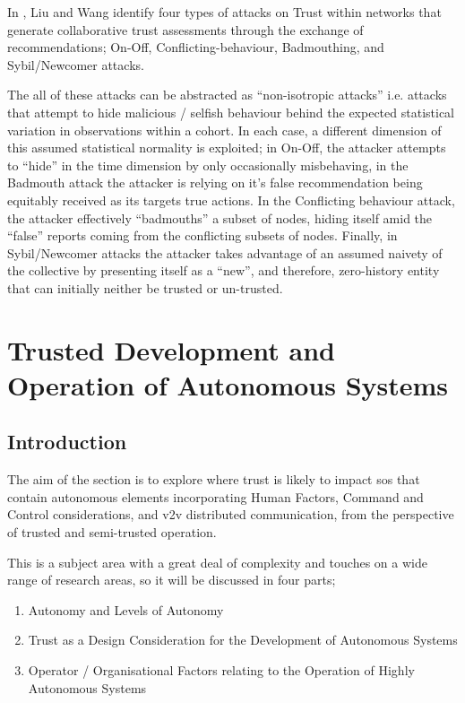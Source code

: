 In \cite{Liu2010}, Liu and Wang identify four types of attacks on Trust within networks that generate collaborative trust assessments through the exchange of recommendations; On-Off, Conflicting-behaviour, Badmouthing, and Sybil/Newcomer attacks. 

The all of these attacks can be abstracted as ``non-isotropic attacks'' i.e. attacks that attempt to hide malicious / selfish behaviour behind the expected statistical variation in observations within a cohort. In each case, a different dimension of this assumed statistical normality is exploited; in On-Off, the attacker attempts to ``hide'' in the time dimension by only occasionally misbehaving, in the Badmouth attack the attacker is relying on it's false recommendation being equitably received as its targets true actions. In the Conflicting behaviour attack, the attacker effectively ``badmouths'' a subset of nodes, hiding itself amid the ``false'' reports coming from the conflicting subsets of nodes. Finally, in Sybil/Newcomer attacks the attacker takes advantage of an assumed naivety of the collective by presenting itself as a ``new'', and therefore, zero-history entity that can initially neither be trusted or un-trusted.




\section{Trusted Development and Operation of Autonomous Systems}

\subsection{Introduction}

The aim of the section is to explore where trust is likely to impact \gls{sos} that contain autonomous elements incorporating Human Factors, Command and Control considerations, and \gls{v2v} distributed communication, from the perspective of trusted and semi-trusted operation.

This is a subject area with a great deal of complexity and touches on a wide range of research areas, so it will be discussed in four parts; 
 
\begin{enumerate}
  \item Autonomy and Levels of Autonomy
  \item Trust as a Design Consideration for the Development of Autonomous Systems
  \item Operator / Organisational Factors relating to the Operation of Highly Autonomous Systems
\end{enumerate}

